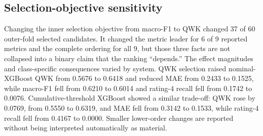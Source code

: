 \documentclass[information,article,submit,pdftex,moreauthors]{Definitions/mdpi}
\begin{document}
\begin{table}[H]
\centering\scriptsize
\caption{Nine-system exactly-once OOF benchmark under P3}
\label{tab:3}
\end{table}

\subsection{Selection-objective sensitivity}

Changing the inner selection objective from macro-F1 to QWK changed 37 of 60 outer-fold selected candidates. It changed the metric leader for 6 of 9 reported metrics and the complete ordering for all 9, but those three facts are not collapsed into a binary claim that the ranking “depends.” The effect magnitudes and class-specific consequences varied by system. QWK selection raised nominal-XGBoost QWK from 0.5676 to 0.6418 and reduced MAE from 0.2433 to 0.1525, while macro-F1 fell from 0.6210 to 0.6014 and rating-4 recall fell from 0.1742 to 0.0076. Cumulative-threshold XGBoost showed a similar trade-off: QWK rose by 0.0769, from 0.5550 to 0.6319, and MAE fell from 0.3142 to 0.1533, while rating-4 recall fell from 0.4167 to 0.0000. Smaller lower-order changes are reported without being interpreted automatically as material.
\end{document}
